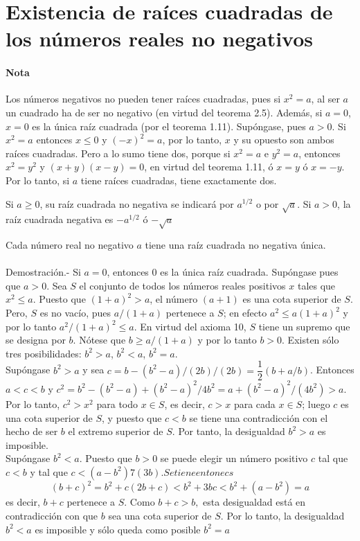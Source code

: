    
\section{Existencia de raíces cuadradas de los números reales no negativos}
\paragraph{Nota}
Los números negativos no pueden tener raíces cuadradas, pues si $x^2=a$, al ser $a$ un cuadrado ha de ser no negativo (en virtud del teorema 2.5). Además, si $a=0$, $x=0$ es la única raíz cuadrada (por el teorema 1.11). Supóngase, pues $a>0$. Si $x^2=a$ entonces $x\leq 0$ y $(-x)^2=a$, por lo tanto, $x$ y su opuesto son ambos raíces cuadradas. Pero a lo sumo tiene dos, porque si $x^2=a$ e $y^2=a$, entonces $x^2=y^2$ \; y \; $(x+y)(x-y)=0$, en virtud del teorema 1.11, \; ó $x=y$ ó $x=-y$. Por lo tanto, si $a$ tiene raíces cuadradas, tiene exactamente dos.
\begin{tcolorbox}
\begin{def.}
Si $a\geq 0$, su raíz cuadrada no negativa se indicará por $a^{1/2}$ o por $\sqrt{a}$. Si $a>0$, la raíz cuadrada negativa es $-a^{1/2}$ ó $-\sqrt{a}$
\end{def.}
\end{tcolorbox}
\begin{teo}
Cada número real no negativo $a$ tiene una raíz cuadrada no negativa única.\\\\
Demostración.- \; Si $a=0$, entonces $0$ es la única raíz cuadrada. Supóngase pues que $a>0$. Sea $S$ el conjunto de todos los números reales positivos $x$ tales que $x^2\leq a$. Puesto que $(1+a)^2>a$, el número $(a+1)$ es una cota superior de $S$. Pero, $S$ es no vacío, pues $a/(1+a)$ pertenece a $S$; en efecto $a^2\leq a(1+a)^2$ y por lo tanto $a^2/(1+a)^2\leq a$. En virtud del axioma 10, $S$ tiene un supremo que se designa por $b$. Nótese que $b\geq a/(1+a)$ y por lo tanto $b>0$. Existen sólo tres posibilidades: $b^2>a$, $b^2<a$, $b^2=a$.\\
Supóngase $b^2>a$ y sea $c=b-(b^2-a)/(2b)/(2b)=\dfrac{1}{2}(b+a/b)$. Entonces $a<c<b$ \; y \; $c^2=b^2-(b^2-a)+(b^2-a)^2/4b^2=a+(b^2-a)^2/(4b^2)>a$. Por lo tanto, $c^2>x^2$ para todo $x \in S$, es decir, $c>x$ para cada $x \in S$; luego $c$ es una cota superior de $S$, y puesto que $c<b$ se tiene una contradicción con el hecho de ser $b$ el extremo superior de $S$. Por tanto, la desigualdad $b^2>a$ es imposible.\\
Supóngase $b^2<a$. Puesto que $b>0$ se puede elegir un número positivo $c$ tal que $c<b$ y tal que $c<(a-b^2)7(3b). Se tiene entonecs$ $$(b+c)^2=b^2+c(2b+c)< b^2 +3bc < b^2 + (a-b^2)=a$$ es decir, $b+c$ pertenece a $S$. Como $b+c>b,$ esta desigualdad está en contradicción con que $b$ sea una cota superior de $S$. Por lo tanto, la desigualdad $b^2<a$ es imposible y sólo queda como posible $b^2=a$\\\\
\end{teo}
 

